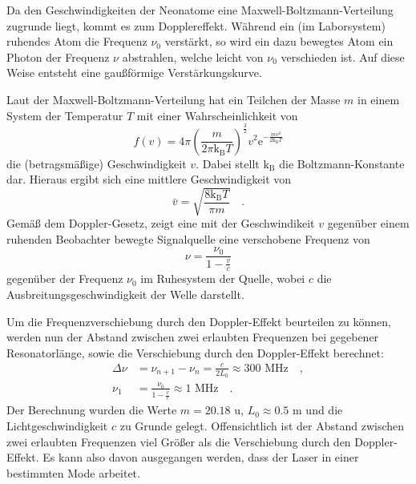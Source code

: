 Da den Geschwindigkeiten der Neonatome eine Maxwell-Boltzmann-Verteilung
zugrunde liegt, kommt es zum Dopplereffekt. Während ein (im Laborsystem)
ruhendes Atom die Frequenz $\nu_0$ verstärkt, so wird ein dazu bewegtes
Atom ein Photon der Frequenz $\nu$ abstrahlen, welche leicht von $\nu_0$
verschieden ist. Auf diese Weise entsteht eine gaußförmige Verstärkungskurve.

Laut der Maxwell-Boltzmann-Verteilung hat ein Teilchen der Masse $m$ in einem 
System der Temperatur $T$ mit einer Wahrscheinlichkeit von
\begin{equation}
f(v)=4\pi \left( \frac{m}{2\pi \text{k}_\text{B} T} \right)^\frac{3}{2} v^2 
\text{e}^{-\frac{mv^2}{2\text{k}_\text{B}T}}
\end{equation}
die (betragsmäßige) Geschwindigkeit $v$. Dabei stellt $\text{k}_\text{B}$ die 
Boltzmann-Konstante dar. Hieraus ergibt sich eine mittlere Geschwindigkeit von 
\begin{equation}
\bar{v}=\sqrt{\frac{8\text{k}_\text{B}T}{\pi m}} \quad .
\end{equation}
Gemäß dem Doppler-Gesetz, zeigt eine mit der Geschwindikeit $v$ gegenüber einem 
ruhenden Beobachter bewegte Signalquelle eine verschobene Frequenz von 
\begin{equation}
\nu = \frac{\nu_0}{1-\frac{v}{c}}
\end{equation}
gegenüber der Frequenz $\nu_0$ im Ruhesystem der Quelle, wobei $c$ die 
Ausbreitungsgeschwindigkeit der Welle darstellt.


Um die Frequenzverschiebung durch den Doppler-Effekt beurteilen zu können, werden 
nun der Abstand zwischen zwei erlaubten Frequenzen bei gegebener Resonatorlänge,
sowie die Verschiebung durch den Doppler-Effekt berechnet:
\begin{align}
\Delta \nu &= \nu_{n+1}-\nu_n=\frac{c}{2 L_0} \approx 300\text{ MHz} \quad , \\
\nu _1 &=  \frac{\nu_0}{1-\frac{\bar{v}}{c}} \approx 1 \text{ MHz} \quad .
\end{align}
Der Berechnung wurden die Werte $m=20.18 \text{ u}$, $L_0\approx 0.5 \text{ m}$ und  
die Lichtgeschwindigkeit $c$ zu Grunde gelegt. Offensichtlich ist der Abstand 
zwischen zwei erlaubten Frequenzen viel Größer als die Verschiebung durch den 
Doppler-Effekt. Es kann also davon ausgegangen werden, dass der Laser in einer 
bestimmten Mode arbeitet.